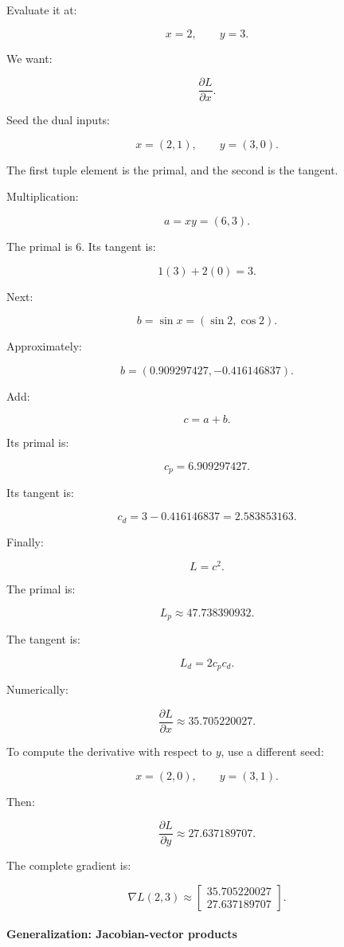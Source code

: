 Evaluate it at:

\[
x=2,\qquad y=3.
\]

We want:

\[
\frac{\partial L}{\partial x}.
\]

Seed the dual inputs:

\[
x=(2,1),\qquad y=(3,0).
\]

The first tuple element is the primal, and the second is the tangent.

Multiplication:

\[
a=xy=(6,3).
\]

The primal is \(6\). Its tangent is:

\[
1(3)+2(0)=3.
\]

Next:

\[
b=\sin x = (\sin2,\cos2).
\]

Approximately:

\[
b=(0.909297427,-0.416146837).
\]

Add:

\[
c=a+b.
\]

Its primal is:

\[
c_p=6.909297427.
\]

Its tangent is:

\[
c_d=3-0.416146837 =2.583853163.
\]

Finally:

\[
L=c^2.
\]

The primal is:

\[
L_p\approx47.738390932.
\]

The tangent is:

\[
L_d=2c_pc_d.
\]

Numerically:

\[
\boxed{ \frac{\partial L}{\partial x} \approx35.705220027 }.
\]

To compute the derivative with respect to \(y\), use a different seed:

\[
x=(2,0),\qquad y=(3,1).
\]

Then:

\[
\boxed{ \frac{\partial L}{\partial y} \approx27.637189707 }.
\]

The complete gradient is:

\[
\boxed{ \nabla L(2,3) \approx \begin{bmatrix} 35.705220027\\ 27.637189707 \end{bmatrix} }.
\]

\paragraph{Generalization: Jacobian-vector products}\label{02-foundations-ii-ch022-generalization-jacobian-vector-products}

